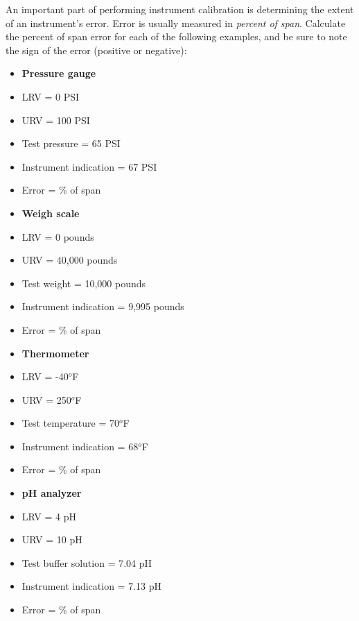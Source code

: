 

An important part of performing instrument calibration is determining the extent of an instrument's error.  Error is usually measured in {\it percent of span}.  Calculate the percent of span error for each of the following examples, and be sure to note the sign of the error (positive or negative):

\begin{itemize}
\item{} {\bf Pressure gauge}
\item{} LRV = 0 PSI
\item{} URV = 100 PSI 
\item{} Test pressure = 65 PSI 
\item{} Instrument indication = 67 PSI
\item{} Error = \underbar{\hskip 50pt} \% of span
\end{itemize}

\vskip 10pt

\begin{itemize}
\item{} {\bf Weigh scale}
\item{} LRV = 0 pounds
\item{} URV = 40,000 pounds
\item{} Test weight = 10,000 pounds
\item{} Instrument indication = 9,995 pounds
\item{} Error = \underbar{\hskip 50pt} \% of span
\end{itemize}

\vskip 10pt

\begin{itemize}
\item{} {\bf Thermometer}
\item{} LRV = -40$^{o}$F
\item{} URV = 250$^{o}$F
\item{} Test temperature = 70$^{o}$F
\item{} Instrument indication = 68$^{o}$F
\item{} Error = \underbar{\hskip 50pt} \% of span
\end{itemize}

\vskip 10pt

\begin{itemize}
\item{} {\bf pH analyzer}
\item{} LRV = 4 pH
\item{} URV = 10 pH
\item{} Test buffer solution = 7.04 pH
\item{} Instrument indication = 7.13 pH
\item{} Error = \underbar{\hskip 50pt} \% of span
\end{itemize}

